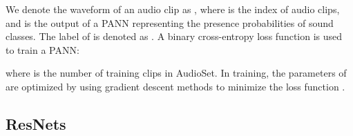 \documentclass[journal]{IEEEtran}
\begin{document}
We denote the waveform of an audio clip as , where  is the index of audio clips, and  is the output of a PANN representing the presence probabilities of  sound classes. The label of  is denoted as . A binary cross-entropy loss function  is used to train a PANN:

\noindent where  is the number of training clips in AudioSet. In training, the parameters of  are optimized by using gradient descent methods to minimize the loss function .


\begin{table}
\centering
\caption{ResNets for AudioSet tagging}
\label{table:resnet_architecture}
\end{table}


\subsection{ResNets}
\end{document}
